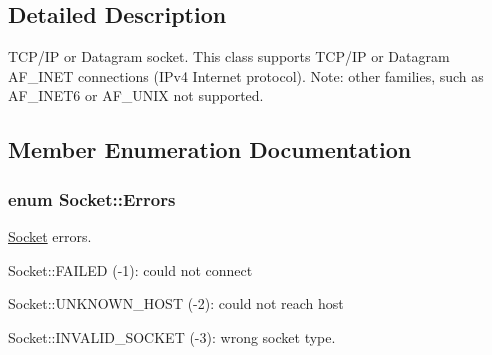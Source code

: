 \subsection{Detailed Description}
T\-C\-P/\-I\-P or Datagram socket. This class supports T\-C\-P/\-I\-P or Datagram A\-F\-\_\-\-I\-N\-E\-T connections (I\-Pv4 Internet protocol). Note\-: other families, such as A\-F\-\_\-\-I\-N\-E\-T6 or A\-F\-\_\-\-U\-N\-I\-X not supported. 

\subsection{Member Enumeration Documentation}
\hypertarget{classSocket_a9f68308228badcdd299cd83e62e36976}{
\subsubsection[{Errors}]{\setlength{\rightskip}{0pt plus 5cm}enum {\bf Socket\-::\-Errors}}}\label{classSocket_a9f68308228badcdd299cd83e62e36976}
\hyperlink{classSocket}{Socket} errors.
\begin{DoxyItemize}
\item Socket\-::\-F\-A\-I\-L\-E\-D (-\/1)\-: could not connect
\item Socket\-::\-U\-N\-K\-N\-O\-W\-N\-\_\-\-H\-O\-S\-T (-\/2)\-: could not reach host
\item Socket\-::\-I\-N\-V\-A\-L\-I\-D\-\_\-\-S\-O\-C\-K\-E\-T (-\/3)\-: wrong socket type. 
\end{DoxyItemize}


